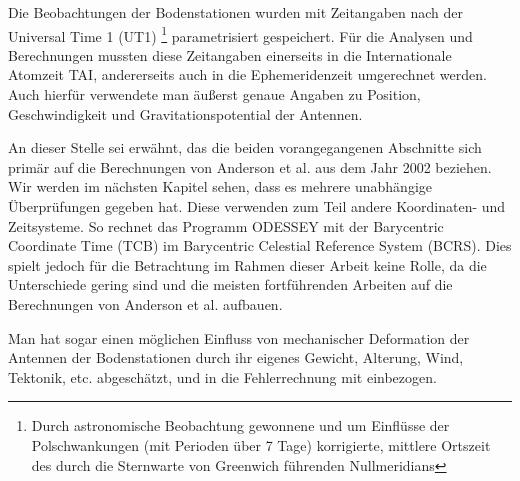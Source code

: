 Die Beobachtungen der Bodenstationen wurden mit Zeitangaben nach der Universal Time 1 (UT1)
\footnote{Durch astronomische Beobachtung gewonnene und um Einflüsse der Polschwankungen (mit Perioden über 7 Tage) korrigierte, mittlere Ortszeit des durch die Sternwarte von Greenwich führenden Nullmeridians}
parametrisiert gespeichert. Für die Analysen und
Berechnungen mussten diese Zeitangaben einerseits in die Internationale Atomzeit TAI, andererseits auch in die
Ephemeridenzeit umgerechnet werden. Auch hierfür verwendete man äußerst genaue Angaben zu Position, Geschwindigkeit und
Gravitationspotential der Antennen.\cite{Dittus2006} %

An dieser Stelle sei erwähnt, das die beiden vorangegangenen Abschnitte sich primär auf die Berechnungen von Anderson et al. aus dem Jahr 2002 beziehen.
Wir werden im nächsten Kapitel sehen, dass es mehrere unabhängige Überprüfungen gegeben hat.
Diese verwenden zum Teil andere Koordinaten- und Zeitsysteme.
So rechnet das Programm ODESSEY mit der Barycentric Coordinate Time (TCB) im Barycentric Celestial Reference System (BCRS).
Dies spielt jedoch für die Betrachtung im Rahmen dieser Arbeit keine Rolle, da die Unterschiede gering sind und die meisten fortführenden Arbeiten auf die Berechnungen von Anderson et al. aufbauen.	%

Man hat sogar einen möglichen Einfluss von mechanischer Deformation der Antennen der Bodenstationen durch ihr eigenes Gewicht,
Alterung, Wind, Tektonik, etc. abgeschätzt, und in die Fehlerrechnung mit einbezogen\cite{Dittus2006}. %



